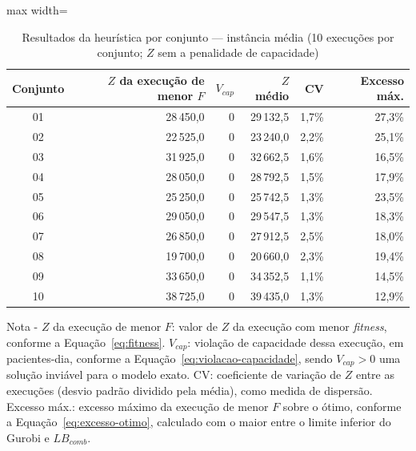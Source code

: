\begin{table}[htbp]
    \caption[Resultados da heurística por conjunto --- instância média]{Resultados da heurística por conjunto --- instância média (10 execuções por conjunto; $Z$ sem a penalidade de capacidade)}
    \label{tab:res-z-medio}
    \centering
    \begin{adjustbox}{max width=\textwidth}
    \begin{tabular}{crrrrr}
        \hline
        \textbf{Conjunto} & \textbf{$Z$ da execução de menor $F$} & \textbf{$V_{cap}$} & \textbf{$Z$ médio} & \textbf{CV} & \textbf{Excesso máx.} \\
        \hline
        01 & 28\,450,0 & 0 & 29\,132,5 & 1,7\% & 27,3\% \\
        02 & 22\,525,0 & 0 & 23\,240,0 & 2,2\% & 25,1\% \\
        03 & 31\,925,0 & 0 & 32\,662,5 & 1,6\% & 16,5\% \\
        04 & 28\,050,0 & 0 & 28\,792,5 & 1,5\% & 17,9\% \\
        05 & 25\,250,0 & 0 & 25\,742,5 & 1,3\% & 23,5\% \\
        06 & 29\,050,0 & 0 & 29\,547,5 & 1,3\% & 18,3\% \\
        07 & 26\,850,0 & 0 & 27\,912,5 & 2,5\% & 18,0\% \\
        08 & 19\,700,0 & 0 & 20\,660,0 & 2,3\% & 19,4\% \\
        09 & 33\,650,0 & 0 & 34\,352,5 & 1,1\% & 14,5\% \\
        10 & 38\,725,0 & 0 & 39\,435,0 & 1,3\% & 12,9\% \\
        \hline
    \end{tabular}
    \end{adjustbox}
    \par\smallskip
    {\footnotesize Nota - $Z$ da execução de menor $F$: valor de $Z$ da execução com menor \textit{fitness}, conforme a Equação~\eqref{eq:fitness}. $V_{cap}$: violação de capacidade dessa execução, em pacientes-dia, conforme a Equação~\eqref{eq:violacao-capacidade}, sendo $V_{cap} > 0$ uma solução inviável para o modelo exato. CV: coeficiente de variação de $Z$ entre as execuções (desvio padrão dividido pela média), como medida de dispersão. Excesso máx.: excesso máximo da execução de menor $F$ sobre o ótimo, conforme a Equação~\eqref{eq:excesso-otimo}, calculado com o maior entre o limite inferior do Gurobi e $LB_{comb}$.}
\end{table}
